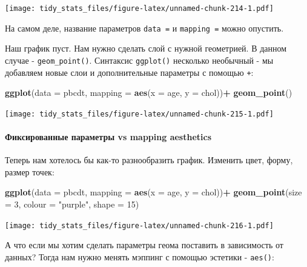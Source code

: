 \documentclass[]{book}
\newenvironment{Shaded}{\begin{snugshade}}{\end{snugshade}}
\newcommand{\KeywordTok}[1]{\textcolor[rgb]{0.13,0.29,0.53}{\textbf{#1}}}
\newcommand{\DataTypeTok}[1]{\textcolor[rgb]{0.13,0.29,0.53}{#1}}
\newcommand{\DecValTok}[1]{\textcolor[rgb]{0.00,0.00,0.81}{#1}}
\newcommand{\StringTok}[1]{\textcolor[rgb]{0.31,0.60,0.02}{#1}}
\newcommand{\OperatorTok}[1]{\textcolor[rgb]{0.81,0.36,0.00}{\textbf{#1}}}
\newcommand{\NormalTok}[1]{#1}
\let\oldparagraph\paragraph
\renewcommand{\paragraph}[1]{\oldparagraph{#1}\mbox{}}
\begin{document}
\texttt{[image: tidy\_stats\_files/figure-latex/unnamed-chunk-214-1.pdf]}

На самом деле, название параметров \texttt{data\ =} и
\texttt{mapping\ =} можно опустить.

Наш график пуст. Нам нужно сделать слой с нужной геометрией. В данном
случае - \texttt{geom\_point()}. Синтаксис \texttt{ggplot()} несколько
необычный - мы добавляем новые слои и дополнительные параметры с помощью
\texttt{+}:

\begin{Shaded}
\begin{Highlighting}[]
\KeywordTok{ggplot}\NormalTok{(}\DataTypeTok{data =}\NormalTok{ pbcdt, }\DataTypeTok{mapping =} \KeywordTok{aes}\NormalTok{(}\DataTypeTok{x =}\NormalTok{ age, }\DataTypeTok{y =}\NormalTok{ chol))}\OperatorTok{+}
\StringTok{  }\KeywordTok{geom_point}\NormalTok{()}
\end{Highlighting}
\end{Shaded}

\texttt{[image: tidy\_stats\_files/figure-latex/unnamed-chunk-215-1.pdf]}

\paragraph{Фиксированные параметры vs mapping
aesthetics}\label{ux444ux438ux43aux441ux438ux440ux43eux432ux430ux43dux43dux44bux435-ux43fux430ux440ux430ux43cux435ux442ux440ux44b-vs-mapping-aesthetics}

Теперь нам хотелось бы как-то разнообразить график. Изменить цвет,
форму, размер точек:

\begin{Shaded}
\begin{Highlighting}[]
\KeywordTok{ggplot}\NormalTok{(}\DataTypeTok{data =}\NormalTok{ pbcdt, }\DataTypeTok{mapping =} \KeywordTok{aes}\NormalTok{(}\DataTypeTok{x =}\NormalTok{ age, }\DataTypeTok{y =}\NormalTok{ chol))}\OperatorTok{+}
\StringTok{  }\KeywordTok{geom_point}\NormalTok{(}\DataTypeTok{size =} \DecValTok{3}\NormalTok{, }\DataTypeTok{colour =} \StringTok{"purple"}\NormalTok{, }\DataTypeTok{shape =} \DecValTok{15}\NormalTok{)}
\end{Highlighting}
\end{Shaded}

\texttt{[image: tidy\_stats\_files/figure-latex/unnamed-chunk-216-1.pdf]}

А что если мы хотим сделать параметры геома поставить в зависимость от
данных? Тогда нам нужно менять мэппинг с помощью эстетики -
\texttt{aes()}:
\end{document}
